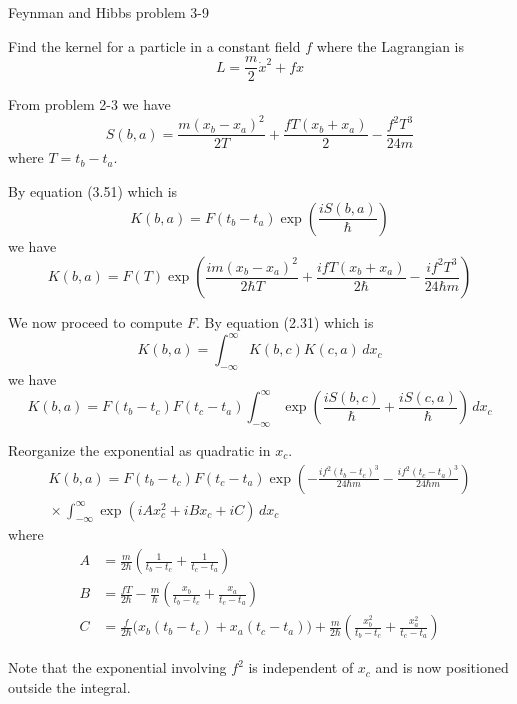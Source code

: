 \documentclass[12pt]{article}
\begin{document}
Feynman and Hibbs problem 3-9

\bigskip
Find the kernel for a particle in a constant field $f$
where the Lagrangian is
\begin{equation*}
L=\frac{m}{2}\dot x^2+fx
\end{equation*}

From problem 2-3 we have
\begin{equation*}
S(b,a)=\frac{m(x_b-x_a)^2}{2T}+\frac{fT(x_b+x_a)}{2}-\frac{f^2T^3}{24m}
\end{equation*}
where $T=t_b-t_a$.

\bigskip
By equation (3.51) which is
\begin{equation*}
K(b,a)=F(t_b-t_a)\exp\left(\frac{iS(b,a)}{\hbar}\right)
\end{equation*}
we have
\begin{equation*}
K(b,a)=
F(T)\exp\left(
\frac{im(x_b-x_a)^2}{2\hbar T}
+\frac{ifT(x_b+x_a)}{2\hbar}
-\frac{if^2T^3}{24\hbar m}
\right)
\tag{1}
\end{equation*}

We now proceed to compute $F$. By equation (2.31) which is
\begin{equation*}
K(b,a)=\int_{-\infty}^\infty K(b,c)K(c,a)\,dx_c
\end{equation*}
we have
\begin{equation*}
K(b,a)=F(t_b-t_c)F(t_c-t_a)\int_{-\infty}^\infty
\exp\left(\frac{iS(b,c)}{\hbar}+\frac{iS(c,a)}{\hbar}\right)
\,dx_c
\end{equation*}

Reorganize the exponential as quadratic in $x_c$.
\begin{multline*}
K(b,a)=F(t_b-t_c)F(t_c-t_a)
\exp\left(-\frac{if^2(t_b-t_c)^3}{24\hbar m}-\frac{if^2(t_c-t_a)^3}{24\hbar m}\right)
\\[1ex]
{}\times
\int_{-\infty}^\infty
\exp\left(iAx_c^2+iBx_c+iC\right)
\,dx_c
\tag{2}
\end{multline*}
where
\begin{align*}
A&=\frac{m}{2\hbar}\left(\frac{1}{t_b-t_c}+\frac{1}{t_c-t_a}\right)
\tag{3}
\\
B&=\frac{fT}{2\hbar}-\frac{m}{\hbar}\left(\frac{x_b}{t_b-t_c}+\frac{x_a}{t_c-t_a}\right)
\tag{4}
\\
C&=\frac{f}{2\hbar}\big(x_b(t_b-t_c)+x_a(t_c-t_a)\big)+\frac{m}{2\hbar}
\left(\frac{x_b^2}{t_b-t_c}+\frac{x_a^2}{t_c-t_a}\right)
\tag{5}
\end{align*}

\bigskip
Note that the exponential involving $f^2$ is independent of $x_c$
and is now positioned outside the integral.
\end{document}
